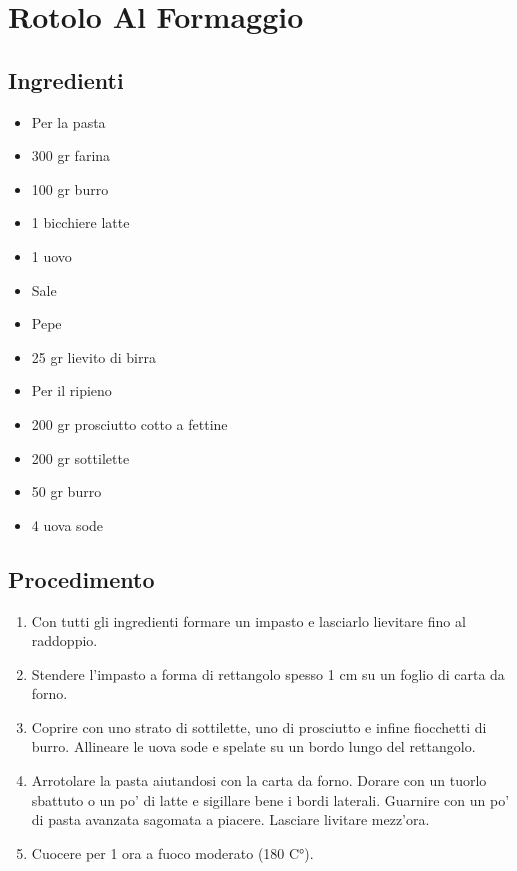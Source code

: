 \section{Rotolo Al Formaggio}
\subsection{Ingredienti}
\begin{itemize}
\item Per la pasta  
\item 300 gr farina  
\item 100 gr burro  
\item 1 bicchiere latte  
\item 1 uovo  
\item Sale  
\item Pepe  
\item 25 gr lievito di birra  
\item Per il ripieno  
\item 200 gr prosciutto cotto a fettine  
\item 200 gr sottilette  
\item 50 gr burro  
\item 4 uova sode
\end{itemize}
\subsection{Procedimento}
\begin{enumerate}
\item  Con tutti gli ingredienti formare un impasto e lasciarlo lievitare fino al raddoppio.  
\item  Stendere l'impasto a forma di rettangolo spesso 1 cm su un foglio di carta da forno.   
\item  Coprire con uno strato di sottilette, uno di prosciutto e infine fiocchetti di burro. Allineare le uova sode e spelate su un bordo lungo del rettangolo.   
\item  Arrotolare la pasta aiutandosi con la carta da forno. Dorare con un tuorlo sbattuto o un po' di latte e sigillare bene i bordi laterali. Guarnire con un po' di pasta avanzata sagomata a piacere. Lasciare livitare mezz'ora.  
\item  Cuocere per 1 ora a fuoco moderato (180 C°).
\end{enumerate}
